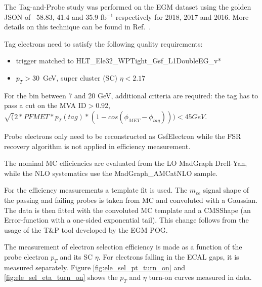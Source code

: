 The Tag-and-Probe study was performed on the EGM dataset using the golden JSON of ~58.83, 41.4 and 35.9 fb$^{-1}$ respectively for 2018, 2017 and 2016. More details on this technique can be found in Ref.~\cite{AN-15-277}. 

Tag electrons need to satisfy the following quality requirements:
\begin{itemize}
\item trigger matched to HLT\_Ele32\_WPTight\_Gsf\_L1DoubleEG\_v*
\item $p_{T} > 30$~GeV, super cluster (SC) $\eta < 2.17$%
\end{itemize}

For the bin between 7 and 20 GeV, additional criteria are required: the tag has to pass a cut on the MVA ID$>0.92$, $\sqrt(2*PFMET*p_T(tag)*(1-cos(\phi_{MET}-\phi_{tag})))<45 GeV$.

Probe electrons only need to be reconstructed as GsfElectron while the FSR recovery algorithm is not applied in efficiency measurement. 


The nominal MC efficiencies are evaluated from the LO MadGraph Drell-Yan, while the NLO systematics use the MadGraph\_AMCatNLO sample.

For the efficiency measurements a template fit is used. The $m_{ee}$ signal shape of the passing and failing probes is taken from MC and convoluted with a Gaussian. The data is then fitted with the convoluted MC template and a CMSShape (an Error-function with a one-sided exponential tail). This change follows from the usage of the T\&P tool developed by the EGM POG.



The measurement of electron selection efficiency is made as a function of the probe electron $p_{T}$ and its SC $\eta$. For electrons falling in the ECAL gaps, it is measured separately. Figure \ref{fig:ele_sel_pt_turn_on} and \ref{fig:ele_sel_eta_turn_on} shows the $p_{T}$ and $\eta$ turn-on curves measured in data.


